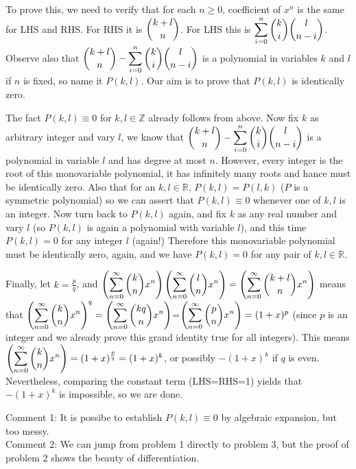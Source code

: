 \documentclass[11pt,a4paper]{article}
\begin{document}
\begin {enumerate}
To prove this, we need to verify that for each $n\ge 0$, coefficient of $x^n$ is the same for LHS and RHS. For RHS it is $\dbinom{k+l}{n}$. For LHS this is $\displaystyle\sum_{i=0}^{n} \dbinom{k}{i}\dbinom{l}{n-i}$. Observe also that $\dbinom{k+l}{n}-\displaystyle\sum_{i=0}^{n} \dbinom{k}{i}\dbinom{l}{n-i}$ is a polynomial in variables $k$ and $l$ if $n$ is fixed, so name it $P(k,l)$. Our aim is to prove that $P(k,l)$ is identically zero.

The fact $P(k,l)\equiv 0$ for $k,l\in\mathbb{Z}$ already follows from above. Now fix $k$ as arbitrary integer and vary $l$, we know that $\dbinom{k+l}{n}-\displaystyle\sum_{i=0}^{n} \dbinom{k}{i}\dbinom{l}{n-i}$ is a polynomial in variable $l$ and has degree at most $n$. However, every integer is the root of this monovariable polynomial, it has infinitely many roots and hance must be identically zero. Also that for an $k,l\in\mathbb{R}$, $P(k,l)=P(l,k)$ ($P$ is a symmetric polynomial) so we can assert that $P(k,l)\equiv 0$ whenever one of $k,l$ is an integer. Now turn back to $P(k,l)$ again, and fix $k$ as any real number and vary $l$ (so $P(k,l)$ is again a polynomial with variable $l$), and this time $P(k,l)=0$ for any integer $l$ (again!) Therefore this monovariable polynomial must be identically zero, again, and we have $P(k,l)=0$ for any pair of $k,l\in\mathbb{R}$.

Finally, let $k=\frac{p}{q}$, and $\left(\displaystyle\sum_{n=0}^{\infty} \dbinom{k}{n} x^n\right)\left(\displaystyle\sum_{n=0}^{\infty} \dbinom{l}{n} x^n\right)=\left(\displaystyle\sum_{n=0}^{\infty} \dbinom{k+l}{n} x^n\right)$ means that $\left(\displaystyle\sum_{n=0}^{\infty} \dbinom{k}{n} x^n\right)^{q}=\left(\displaystyle\sum_{n=0}^{\infty} \dbinom{kq}{n} x^n\right)$=$\left(\displaystyle\sum_{n=0}^{\infty} \dbinom{p}{n} x^n\right)=(1+x)^{p}$ (since $p$ is an integer and we already prove this grand identity true for all integers). This means $\left(\displaystyle\sum_{n=0}^{\infty} \dbinom{k}{n} x^n\right)=(1+x)^{\frac{p}{q}}=(1+x)^{k}$, or possibly $-(1+x)^{k}$ if $q$ is even. Nevertheless, comparing the constant term (LHS=RHS=1) yields that $-(1+x)^{k}$ is impossible, so we are done.

Comment 1: It is possibe to establish $P(k,l)\equiv 0$ by algebraic expansion, but too messy.\\
Comment 2: We can jump from problem 1 directly to problem 3, but the proof of problem 2 shows the beauty of differentiation.
\end{enumerate}
\end{document}
